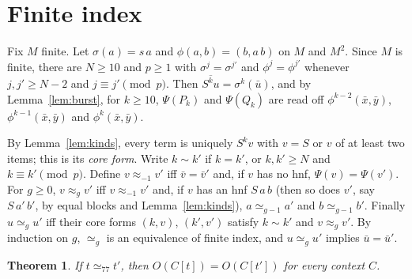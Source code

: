 \documentclass[11pt]{amsart}
\newtheorem{theorem}{Theorem}
\theoremstyle{definition}
\begin{document}
\section{Finite index}

Fix $M$ finite. Let $\sigma(a)=s\,a$ and $\phi(a,b)=(b,a\,b)$ on $M$ and $M^2$. Since $M$ is finite,
there are $N\ge10$ and $p\ge1$ with $\sigma^j=\sigma^{j'}$ and $\phi^j=\phi^{j'}$ whenever
$j,j'\ge N-2$ and $j\equiv j'\pmod p$. Then $\overline{S^k u}=\sigma^k(\bar u)$, and by
Lemma~\ref{lem:burst}, for $k\ge10$, $\Psi(P_k)$ and $\Psi(Q_k)$ are read off
$\phi^{k-2}(\bar x,\bar y)$, $\phi^{k-1}(\bar x,\bar y)$ and $\phi^k(\bar x,\bar y)$.

By Lemma~\ref{lem:kinds}, every term is uniquely $S^k v$ with $v=S$ or $v$ of at least two items; this is
its \emph{core form}. Write $k\sim k'$ if $k=k'$, or $k,k'\ge N$ and $k\equiv k'\pmod p$. Define
$v\approx_{-1}v'$ iff $\bar v=\bar v'$ and, if $v$ has no hnf, $\Psi(v)=\Psi(v')$. For $g\ge0$,
$v\approx_g v'$ iff $v\approx_{-1}v'$ and, if $v$ has an hnf $S\,a\,b$ (then so does $v'$, say
$S\,a'\,b'$, by equal blocks and Lemma~\ref{lem:kinds}), $a\simeq_{g-1}a'$ and $b\simeq_{g-1}b'$.
Finally $u\simeq_g u'$ iff their core forms $(k,v)$, $(k',v')$ satisfy $k\sim k'$ and $v\approx_g v'$.
By induction on $g$, $\simeq_g$ is an equivalence of finite index, and $u\simeq_g u'$ implies
$\bar u=\bar u'$.

\begin{theorem}\label{thm:index}
If $t\simeq_{77}t'$, then $O(C[t])=O(C[t'])$ for every context $C$.
\end{theorem}
\end{document}
